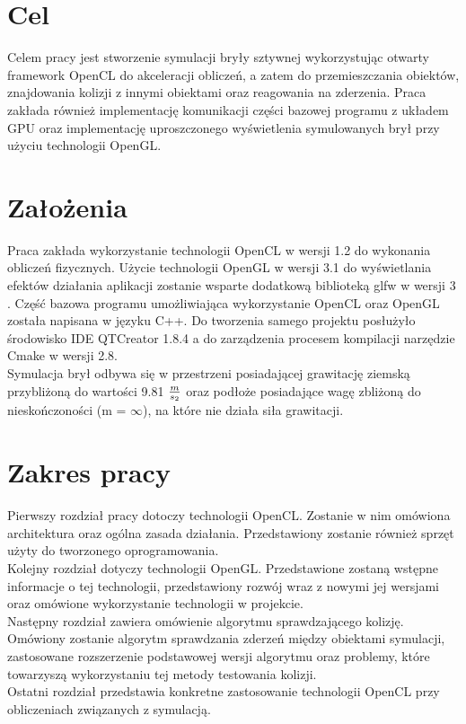 \section{Cel}
Celem pracy jest stworzenie symulacji bryły sztywnej wykorzystując otwarty framework OpenCL do akceleracji obliczeń, a zatem do przemieszczania obiektów, znajdowania kolizji z innymi obiektami oraz reagowania na zderzenia. Praca zakłada również implementację komunikacji części bazowej programu z układem GPU oraz implementację uproszczonego wyświetlenia symulowanych brył przy użyciu technologii OpenGL.

\section{Założenia}
Praca zakłada wykorzystanie technologii OpenCL w wersji 1.2 do wykonania obliczeń fizycznych. Użycie technologii OpenGL w wersji 3.1 do wyświetlania efektów działania aplikacji zostanie wsparte dodatkową biblioteką glfw w wersji 3 \cite{GLFW}. Część bazowa programu umożliwiająca wykorzystanie OpenCL oraz OpenGL została napisana w języku C++. Do tworzenia samego projektu posłużyło środowisko IDE QTCreator 1.8.4 a do zarządzenia procesem kompilacji narzędzie Cmake w wersji 2.8. \\
Symulacja brył odbywa się w przestrzeni posiadającej grawitację ziemską przybliżoną do wartości 9.81 $m \over s_2$ oraz podłoże posiadające wagę zbliżoną do nieskończoności (m = $\infty$), na które nie działa siła grawitacji.

\section{Zakres pracy}
Pierwszy rozdział pracy dotoczy technologii OpenCL. Zostanie w nim omówiona architektura oraz ogólna zasada działania. Przedstawiony zostanie również sprzęt użyty do tworzonego oprogramowania.\\
Kolejny rozdział dotyczy technologii OpenGL. Przedstawione zostaną wstępne informacje o tej technologii, przedstawiony rozwój wraz z nowymi jej wersjami oraz omówione wykorzystanie technologii w projekcie.\\
Następny rozdział zawiera omówienie algorytmu sprawdzającego kolizję. Omówiony zostanie algorytm sprawdzania zderzeń między obiektami symulacji, zastosowane rozszerzenie podstawowej wersji algorytmu oraz problemy, które towarzyszą wykorzystaniu tej metody testowania kolizji.\\
Ostatni rozdział przedstawia konkretne zastosowanie technologii OpenCL przy obliczeniach związanych z symulacją.